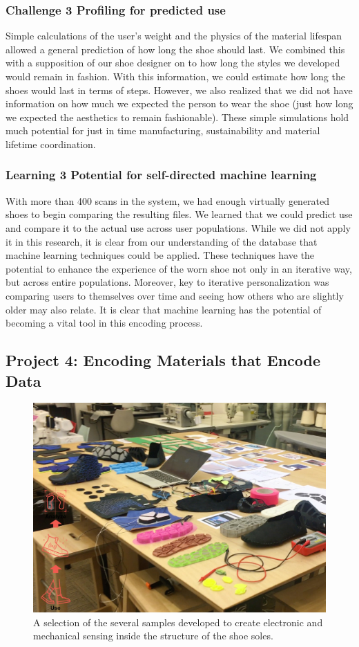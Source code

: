 \subsubsection{Challenge 3 Profiling for predicted use}

Simple calculations of the user's weight and the physics of the material lifespan allowed a general prediction of how long the shoe should last. We combined this with a supposition of our shoe designer on to how long the styles we developed would remain in fashion. With this information, we could estimate how long the shoes would last in terms of steps.  However, we also realized that we did not have information on how much we expected the person to wear the shoe (just how long we expected the aesthetics to remain fashionable). These simple simulations hold much potential for just in time manufacturing, sustainability and material lifetime coordination.  

\subsubsection{Learning 3 Potential for self-directed machine learning}

With more than 400 scans in the system, we had enough virtually generated shoes to begin comparing the resulting files. We learned that we could predict use and compare it to the actual use across user populations. While we did not apply it in this research, it is clear from our understanding of the database that machine learning techniques could be applied. These techniques have the potential to enhance the experience of the worn shoe not only in an iterative way, but across entire populations. Moreover, key to iterative personalization was comparing users to themselves over time and seeing how others who are slightly older may also relate. It is clear that machine learning has the potential of becoming a vital tool in this encoding process.

\subsection{Project 4: Encoding Materials that Encode Data}


\begin{figure}
\includegraphics[width=.5\textwidth]{Eva}
\caption{A selection of the several samples developed to create electronic and mechanical sensing inside the structure of the shoe soles.}
\label{fig:Project4}
\end{figure}

